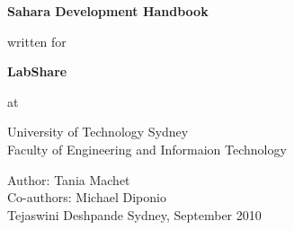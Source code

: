 
\thispagestyle{empty}

\begin{center}
{\huge {\bf Sahara Development Handbook}}

\vspace{1.5cm}
written for

\vspace{1.5cm}
{\Large {\bf 
\baselineskip25pt
LabShare \\}}

\vspace{1.5cm}
at

\vspace{1cm}
University of Technology Sydney \\ Faculty of Engineering and Informaion Technology


\vspace{10cm}
\center Author: Tania Machet\\
Co-authors: Michael Diponio\\
 Tejaswini Deshpande
\vspace{1cm}
\medskip
\vfill
Sydney, September 2010
\end{center}


